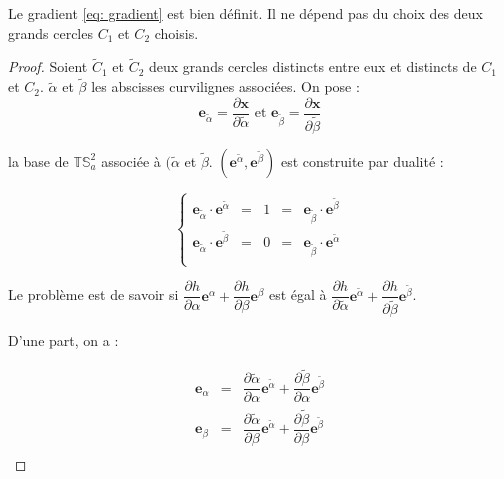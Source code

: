 \begin{proposition}
Le gradient \eqref{eq: gradient} est bien définit. Il ne dépend pas du choix des deux grands cercles $C_1$ et $C_2$ choisis.
\end{proposition}

\begin{proof}
Soient $\tilde{C}_1$ et $\tilde{C}_2$ deux grands cercles distincts entre eux et distincts de $C_1$ et $C_2$. $\tilde{\alpha}$ et $\tilde{\beta}$ les abscisses curvilignes associées. On pose :
\begin{equation}
\mathbf{e}_{\tilde{\alpha}} = \dfrac{\partial \mathbf{x}}{\partial \tilde{\alpha}} \text{ et } \mathbf{e}_{\tilde{\beta}} = \dfrac{\partial \mathbf{x}}{\partial \tilde{\beta}}
\end{equation}

la base de $\mathbb{T}\mathbb{S}_a^2$ associée à $(\tilde{\alpha}$ et $\tilde{\beta}$. $\left( \mathbf{e}^{\tilde{\alpha}}, \mathbf{e}^{\tilde{\beta}} \right)$ est construite par dualité :

\begin{equation}
\left\lbrace
\begin{array}{rcccl}
\mathbf{e}_{\tilde{\alpha}} \cdot \mathbf{e}^{\tilde{\alpha}} & = & 1 & = & \mathbf{e}_{\tilde{\beta}} \cdot \mathbf{e}^{\tilde{\beta}} \\
\mathbf{e}_{\tilde{\alpha}} \cdot \mathbf{e}^{\tilde{\beta}} & = & 0 & = & \mathbf{e}_{\tilde{\beta}} \cdot \mathbf{e}^{\tilde{\alpha}} \\
\end{array}
\right.
\end{equation}

Le problème est de savoir si $\dfrac{\partial h}{\partial \alpha} \mathbf{e}^{\alpha} + \dfrac{\partial h}{\partial \beta} \mathbf{e}^{\beta}$ est égal à $\dfrac{\partial h}{\partial \tilde{\alpha}} \mathbf{e}^{\tilde{\alpha}} + \dfrac{\partial h}{\partial \tilde{\beta}} \mathbf{e}^{\tilde{\beta}}$.

D'une part, on a :

\begin{equation}
\begin{array}{rcl}
\mathbf{e}_{\alpha} & = & \dfrac{\partial \tilde{\alpha}}{\partial \alpha} \mathbf{e}^{\tilde{\alpha}} + \dfrac{\partial \tilde{\beta}}{\partial \alpha} \mathbf{e}^{\tilde{\beta}} \\
\mathbf{e}_{\beta} & = & \dfrac{\partial \tilde{\alpha}}{\partial \beta} \mathbf{e}^{\tilde{\alpha}} + \dfrac{\partial \tilde{\beta}}{\partial \beta} \mathbf{e}^{\tilde{\beta}} \\
\end{array}
\end{equation}


\end{proof}
